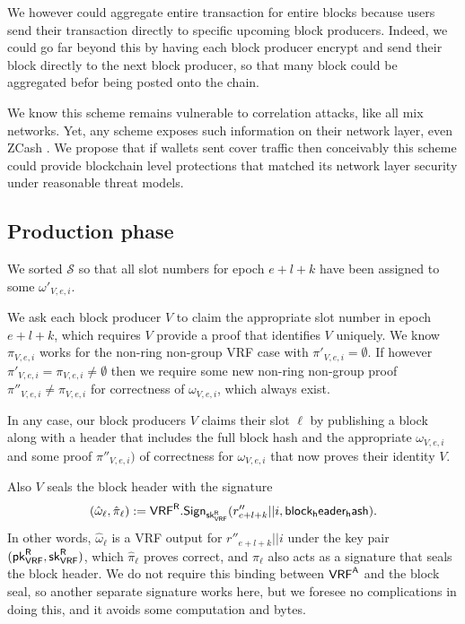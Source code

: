 We however could aggregate entire transaction for entire blocks because users send their transaction directly to specific upcoming block producers.  Indeed, we could go far beyond this by having each block producer encrypt and send their block directly to the next block producer, so that many block could be aggregated befor being posted onto the chain.

We know this scheme remains vulnerable to correlation attacks, like all mix networks.  Yet, any scheme exposes such information on their network layer, even ZCash \cite{ZCash_vulnerable_2019}.  We propose that if wallets sent cover traffic then conceivably this scheme could provide blockchain level protections that matched its network layer security under reasonable threat models. 


\subsection{Production phase}\label{subsec:production_phase}

We sorted $\mathcal{S}$ so that all slot numbers for epoch $e+l+k$ have been assigned to some $\omega'_{V,e,i}$.  

We ask each block producer $V$ to claim the appropriate slot number in epoch $e+l+k$, which requires $V$ provide a proof that identifies $V$ uniquely.  We know $\pi_{V,e,i}$ works for the non-ring non-group VRF case with $\pi'_{V,e,i} = \emptyset$.  If however $\pi'_{V,e,i} = \pi_{V,e,i} \ne \emptyset$ then we require some new non-ring non-group proof $\pi''_{V,e,i} \ne \pi_{V,e,i}$ for correctness of $\omega_{V,e,i}$, which always exist.

In any case, our block producers $V$ claims their slot $\ell$ by publishing a block along with a header that includes the full block hash and the appropriate $\omega_{V,e,i}$ and some proof $\pi''_{V,e,i})$ of correctness for $\omega_{V,e,i}$ that now proves their identity $V$.  

Also $V$ seals the block header with the signature
$$ (\hat{\omega}_{\ell},\hat{\pi}_{\ell}) := \mathsf{VRF}^{\mathsf{R}}.\mathsf{Sign}_{\mathsf{sk}_{\mathsf{VRF}}^{\mathsf{R}}}(r''_{e+l+k} || i, \mathsf{block_header_hash}) . $$
In other words, $\hat{\omega}_{\ell}$ is a VRF output for $r''_{e+l+k} || i$ under the key pair $(\mathsf{pk}_{\mathsf{VRF}}^{\mathsf{R}},\mathsf{sk}_{\mathsf{VRF}}^{\mathsf{R}})$, which $\hat{\pi}_{\ell}$ proves correct, and $\hat{\pi}_{\ell}$ also acts as a signature that seals the block header.  We do not require this binding between $\mathsf{VRF}^{\mathsf{A}}$ and the block seal, so another separate signature works here, but we foresee no complications in doing this, and it avoids some computation and bytes.


